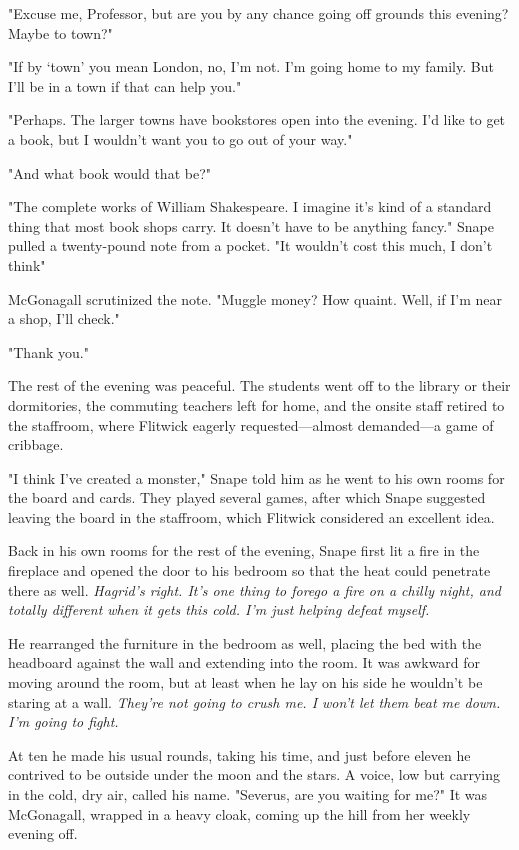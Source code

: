 "Excuse me, Professor, but are you by any chance going off grounds this evening? Maybe to town?"

"If by `town' you mean London, no, I'm not. I'm going home to my family. But I'll be in a town if that can help you."

"Perhaps. The larger towns have bookstores open into the evening. I'd like to get a book, but I wouldn't want you to go out of your way."

"And what book would that be?"

"The complete works of William Shakespeare. I imagine it's kind of a standard thing that most book shops carry. It doesn't have to be anything fancy." Snape pulled a twenty-pound note from a pocket. "It wouldn't cost this much, I don't think"

McGonagall scrutinized the note. "Muggle money? How quaint. Well, if I'm near a shop, I'll check."

"Thank you."

The rest of the evening was peaceful. The students went off to the library or their dormitories, the commuting teachers left for home, and the onsite staff retired to the staffroom, where Flitwick eagerly requested—almost demanded—a game of cribbage.

"I think I've created a monster," Snape told him as he went to his own rooms for the board and cards. They played several games, after which Snape suggested leaving the board in the staffroom, which Flitwick considered an excellent idea.

Back in his own rooms for the rest of the evening, Snape first lit a fire in the fireplace and opened the door to his bedroom so that the heat could penetrate there as well. \emph{Hagrid's right. It's one thing to forego a fire on a chilly night, and totally different when it gets this cold. I'm just helping defeat myself.}

He rearranged the furniture in the bedroom as well, placing the bed with the headboard against the wall and extending into the room. It was awkward for moving around the room, but at least when he lay on his side he wouldn't be staring at a wall. \emph{They're not going to crush me. I won't let them beat me down. I'm going to fight.}

At ten he made his usual rounds, taking his time, and just before eleven he contrived to be outside under the moon and the stars. A voice, low but carrying in the cold, dry air, called his name. "Severus, are you waiting for me?" It was McGonagall, wrapped in a heavy cloak, coming up the hill from her weekly evening off.

